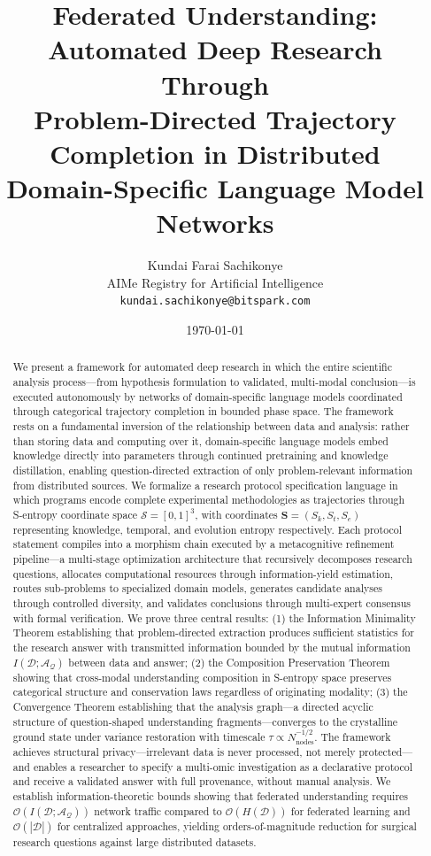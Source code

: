 \documentclass[10pt,twocolumn]{article}
\title{\textbf{Federated Understanding: Automated Deep Research Through\\Problem-Directed Trajectory Completion in Distributed\\Domain-Specific Language Model Networks}}
\author{
Kundai Farai Sachikonye\\
AIMe Registry for Artificial Intelligence\\
\texttt{kundai.sachikonye@bitspark.com}
}
\date{\today}
\theoremstyle{definition}
\theoremstyle{remark}
\newcommand{\Sk}{S_k}
\newcommand{\St}{S_t}
\newcommand{\Se}{S_e}
\newcommand{\Scoord}{\mathbf{S}}
\newcommand{\Sspace}{\mathcal{S}}
\newcommand{\question}{\mathcal{Q}}
\newcommand{\answer}{\mathcal{A}}
\newcommand{\dataset}{\mathcal{D}}
\newcommand{\Sk}{\mathscr{S}_k}
\newcommand{\Se}{\mathscr{S}_e}
\begin{document}
\maketitle

\begin{abstract}
We present a framework for automated deep research in which the entire scientific analysis process---from hypothesis formulation to validated, multi-modal conclusion---is executed autonomously by networks of domain-specific language models coordinated through categorical trajectory completion in bounded phase space. The framework rests on a fundamental inversion of the relationship between data and analysis: rather than storing data and computing over it, domain-specific language models embed knowledge directly into parameters through continued pretraining and knowledge distillation, enabling question-directed extraction of only problem-relevant information from distributed sources. We formalize a research protocol specification language in which programs encode complete experimental methodologies as trajectories through S-entropy coordinate space $\Sspace = [0,1]^3$, with coordinates $\Scoord = (\Sk, \St, \Se)$ representing knowledge, temporal, and evolution entropy respectively. Each protocol statement compiles into a morphism chain executed by a metacognitive refinement pipeline---a multi-stage optimization architecture that recursively decomposes research questions, allocates computational resources through information-yield estimation, routes sub-problems to specialized domain models, generates candidate analyses through controlled diversity, and validates conclusions through multi-expert consensus with formal verification. We prove three central results: (1) the Information Minimality Theorem establishing that problem-directed extraction produces sufficient statistics for the research answer with transmitted information bounded by the mutual information $I(\dataset; \answer_\question)$ between data and answer; (2) the Composition Preservation Theorem showing that cross-modal understanding composition in S-entropy space preserves categorical structure and conservation laws regardless of originating modality; (3) the Convergence Theorem establishing that the analysis graph---a directed acyclic structure of question-shaped understanding fragments---converges to the crystalline ground state under variance restoration with timescale $\tau \propto N_{\text{nodes}}^{-1/2}$. The framework achieves structural privacy---irrelevant data is never processed, not merely protected---and enables a researcher to specify a multi-omic investigation as a declarative protocol and receive a validated answer with full provenance, without manual analysis. We establish information-theoretic bounds showing that federated understanding requires $\mathcal{O}(I(\dataset; \answer_\question))$ network traffic compared to $\mathcal{O}(H(\dataset))$ for federated learning and $\mathcal{O}(|\dataset|)$ for centralized approaches, yielding orders-of-magnitude reduction for surgical research questions against large distributed datasets.


\end{abstract}
\end{document}
